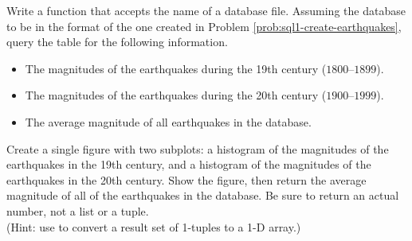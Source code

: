 Write a function that accepts the name of a database file.
Assuming the database to be in the format of the one created in Problem \ref{prob:sql1-create-earthquakes}, query the  table for the following information.
\begin{itemize}
    \item The magnitudes of the earthquakes during the 19th century ($1800$--$1899$).
    \item The magnitudes of the earthquakes during the 20th century ($1900$--$1999$).
    \item The average magnitude of all earthquakes in the database.
\end{itemize}
Create a single figure with two subplots: a histogram of the magnitudes of the earthquakes in the 19th century, and a histogram of the magnitudes of the earthquakes in the 20th century.
Show the figure, then return the average magnitude of all of the earthquakes in the database.
Be sure to return an actual number, not a list or a tuple.
\\(Hint: use  to convert a result set of 1-tuples to a 1-D array.)
\label{prob:sql1-earthquake-analysis}
